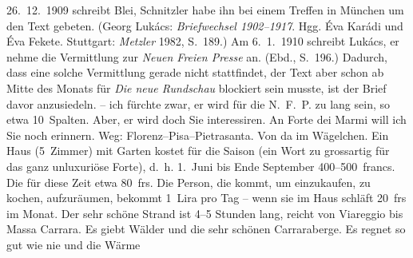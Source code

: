 \begin{ledgroupsized}[t]{13cm}
{{{                     26. 12. 1909 schreibt Blei,
                     Schnitzler habe ihn bei einem Treffen in München um den Text gebeten. (Georg Lukács: \emph{Briefwechsel
                        1902–1917}. Hgg. Éva Karádi und Éva Fekete. Stuttgart:
                        \emph{Metzler}{ }1982, S. 189.) Am 6. 1. 1910 schreibt Lukács, er nehme die Vermittlung zur \emph{Neuen Freien Presse} an. (Ebd.,
                  S. 196.) Dadurch, dass eine solche Vermittlung gerade nicht stattfindet,
                  der Text aber schon ab Mitte des Monats für \emph{Die neue
                     Rundschau} blockiert sein musste, ist der Brief davor anzusiedeln.}}}\label{K_L01998_2h} –
               ich fürchte zwar, er wird für die N. F. P. zu lang
               sein, so etwa 10 Spalten. Aber, er wird doch Sie interessiren.\pend
           \pstart
           An Forte dei Marmi will ich Sie noch erinnern.
               Weg: Florenz–Pisa–Pietrasanta. Von da im Wägelchen.
               Ein Haus (5 Zimmer) mit Garten kostet für die Saison (ein Wort zu grossartig für das
               ganz unluxuriöse Forte), d. h.
                  1. Juni bis Ende September 400–500 francs. Die \label{K_L01998_3v}\label{K_L01998_3h} für diese Zeit etwa 80 frs.
               Die Person, die kommt, um einzukaufen, zu kochen, aufzuräumen, bekommt 1 Lira pro Tag
               – wenn sie im Haus schläft 20 frs im Monat. {\pb}Der sehr schöne Strand ist 4–5 Stunden
               lang, reicht von Viareggio bis Massa Carrara. Es giebt Wälder und die sehr schönen Carraraberge. Es regnet so gut wie nie und die Wärme

\end{ledgroupsized}
